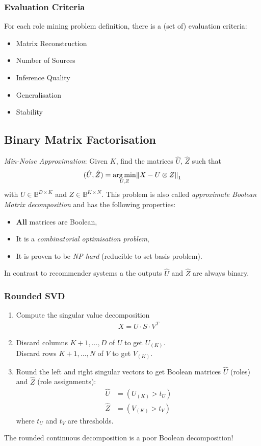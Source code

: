 \subsubsection{Evaluation Criteria}
For each role mining problem definition, there is a (set of) evaluation criteria:
\begin{itemize}
\item Matrix Reconstruction
\item Number of Sources
\item Inference Quality
\item Generalisation
\item Stability
\end{itemize}

\subsection{Binary Matrix Factorisation}
\emph{Min-Noise Approximation}: Given $K$, find the matrices $\hat U$, $\hat Z$ such that
\begin{align*}
    (\hat U, \hat Z) =\argmin_{U,Z} \norm{X-U\otimes Z}_1
\end{align*}
with $U\in \mathbb B^{D\times K}$ and $Z\in \mathbb B^{K\times N}$. This problem is also called \emph{approximate Boolean Matrix decomposition} and has the following properties:
\begin{itemize}
    \item \textbf{All} matrices are Boolean,
    \item It is a \emph{combinatorial optimisation problem},
    \item It is proven to be \emph{NP-hard} (reducible to set basis problem).
\end{itemize}
In contrast to recommender systems a the outputs $\hat U$ and $\hat Z$ are always binary.

\subsubsection{Rounded SVD}
\begin{enumerate}
    \item Compute the singular value decomposition
        \begin{align*}
            X=U\cdot S\cdot V^T
        \end{align*}
    \item Discard columns $K+1,\ldots,D$ of $U$ to get $U_{(K)}$.\\
          Discard rows $K+1,\ldots,N$ of $V$ to get $V_{(K)}$.
    \item Round the left and right singular vectors to get Boolean matrices $\hat U$ (roles) and $\hat Z$ (role assignments):
        \begin{align*}
            \hat U &= (U_{(K)} > t_U)\\
            \hat Z &= (V_{(K)} > t_V)
        \end{align*}
        where $t_U$ and $t_V$ are thresholds.
\end{enumerate}
The rounded continuous decomposition is a poor Boolean decomposition!

